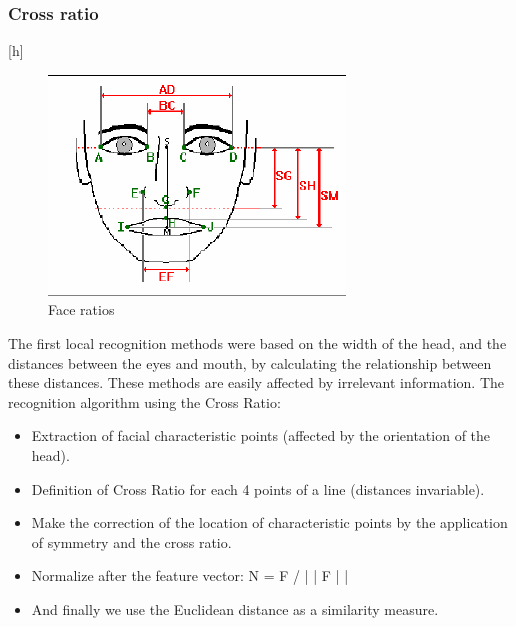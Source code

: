 \subsubsection{Cross ratio}[h]
	\begin{figure}
	\includegraphics[width = \columnwidth]{img/ratio.png}
	\caption{Face ratios}
	\end{figure}
	The first local recognition methods were based on the width of the head, and
the distances between the eyes and mouth, by calculating the relationship between these distances. These methods are easily affected by irrelevant information.
The recognition algorithm using the Cross Ratio:
\begin{itemize}
\item Extraction of facial characteristic points (affected by the orientation of the head).
\item Definition of Cross Ratio for each 4 points of a line (distances
invariable). 
\item Make the correction of the location of characteristic points by
the application of symmetry and the cross ratio. 
\item Normalize after the feature vector:
N = F / | | F | |
\item And finally we use the Euclidean distance as a similarity measure.
\end{itemize}


